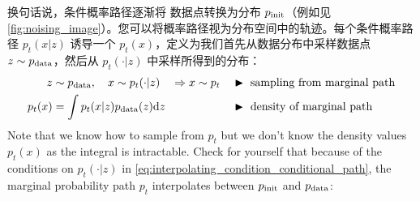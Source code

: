 换句话说，条件概率路径逐渐将  数据点转换为分布 $p_{\rm{init}}$（例如见\cref{fig:noising_image}）。您可以将概率路径视为分布空间中的轨迹。每个条件概率路径 $p_t(x|z)$ 诱导一个  $p_t(x)$，定义为我们首先从数据分布中采样数据点 $z\sim p_{\rm{data}}$，然后从 $p_t(\cdot|z)$ 中采样所得到的分布：
\begin{align}
    \label{eq:marginal_prob_path}
    z&\sim p_{\rm{data}}, \quad x\sim p_t(\cdot|z)\quad \Rightarrow x\sim p_t &&\blacktriangleright\,\,\text{sampling from marginal path}\\
    p_t(x) &= \int p_t(x|z) p_{\rm{data}} (z) \mathrm{d} z &&\blacktriangleright\,\,\text{density of marginal path}
\end{align}
Note that we know how to sample from $p_t$ but we don't know the density values $p_t(x)$ as the integral is intractable. Check for yourself that because of the conditions on $p_t(\cdot|z)$ in \cref{eq:interpolating_condition_conditional_path}, the marginal probability path $p_t$ interpolates between $p_{\rm{init}}$ and $p_{\rm{data}}$:

